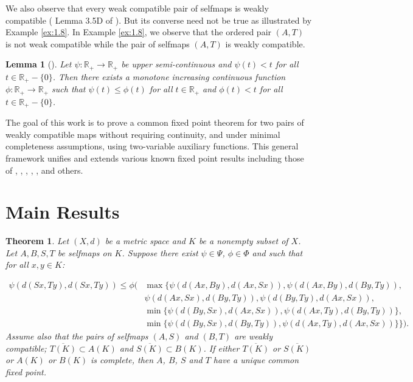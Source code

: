 \documentclass[11]{article}
\newtheorem{theorem}[definition]{Theorem}
\newtheorem{lemma}[definition]{Lemma}
\numberwithin{equation}{section}
\begin{document}
We also observe that every weak compatible pair of selfmaps is weakly compatible ( Lemma 3.5D of \cite{Murthy1998}). But its converse need not be true as illustrated by Example \ref{ex:1.8}. In Example \ref{ex:1.8}, we observe that the ordered pair $(A,T)$ is not weak compatible while the pair of selfmaps $(A,T)$ is weakly compatible.

\begin{lemma}[\cite{KrishnaMurthy2004}] \label{lem:1.11}
Let $\psi:\mathbb{R}_{+}\to\mathbb{R}_{+}$ be upper semi-continuous and $\psi(t)<t$ for all $t\in\mathbb{R}_{+}-\{0\}$. Then there exists a monotone increasing continuous function $\phi:\mathbb{R}_{+}\to\mathbb{R}_{+}$ such that $\psi(t)\leq\phi(t)$ for all $t\in\mathbb{R}_{+}$ and $\phi(t)<t$ for all $t\in\mathbb{R}_{+}-\{0\}$.
\end{lemma}

The goal of this work is to prove a common fixed point theorem for two pairs of weakly compatible maps without requiring continuity, and under minimal completeness assumptions, using two-variable auxiliary functions. This general framework unifies and extends various known fixed point results including those of \cite{AlThagafi2006},  \cite{Jungck1994}, \cite{Murthy1998}, \cite{Pant1994}, \cite{Zhang2008}, and others.

\section{Main Results}

\begin{theorem}\label{thm:main}
Let $(X,d)$ be a metric space and $K$ be a nonempty subset of $X$. Let $A,B,S,T$ be selfmaps on $K$. Suppose there exist $\psi\in\Psi$, $\phi\in\Phi$ and such that for all $x,y\in K$:

\begin{align} \label{eq:2.1}
    \psi(d(Sx,Ty),d(Sx,Ty)) \leq \phi(&\max\{\psi(d(Ax,By),d(Ax,Sx)),\psi(d(Ax,By),d(By,Ty)),\nonumber \\
 &\psi(d(Ax,Sx),d(By,Ty)), \psi(d(By,Ty),d(Ax,Sx)),\\
 &\min\{\psi(d(By,Sx),d(Ax,Sx)),
\psi(d(Ax,Ty),d(By,Ty))\},  \nonumber\\
&\min\{\psi(d(By,Sx),d(By,Ty)), 
\psi(d(Ax,Ty),d(Ax,Sx))\}\}). \nonumber
\end{align}
Assume also that the pairs of selfmaps $(A,S)$ and $(B,T)$ are weakly compatible; $\overline{T(K)}\subset A(K)$ and $\overline{S(K)}\subset B(K)$. If either $\overline{T(K)}$ or $\overline{S(K)}$ or $A(K)$ or $B(K)$ is complete, then $A$, $B$, $S$ and $T$ have a unique common fixed point.
\end{theorem}
\end{document}
